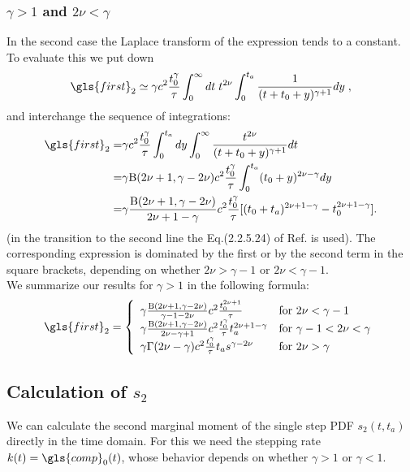 \subsubsection{$\gamma>1$ and $2\nu < \gamma$}
In the second case the Laplace transform of the expression tends to a constant. To evaluate this we put down 
\begin{equation}
 \gls{first}_2 \simeq  \gamma c^2 \frac{t_0^\gamma}{\tau} \int_0^\infty dt \; t^{2\nu} \int_0^{t_a} \frac{1}{(t+t_0+y)^{\gamma+1}} dy \; ,
\end{equation}
and interchange the sequence of integrations:
\begin{align}
 \gls{first}_2 =& \gamma c^2 \frac{ t_0^\gamma}{\tau} \int_0^{t_a} dy \int_0^\infty \frac{t^{2\nu}}{(t+t_0+y)^{\gamma+1}} dt \nonumber \\
 =& \gamma \mathrm{B}(2\nu+1,\gamma - 2\nu) c^2 \frac{ t_0^\gamma}{\tau}  \int_0^{t_a} (t_0+y)^{2\nu -\gamma} dy \nonumber \\
 =& \gamma  \frac{\mathrm{B}(2\nu+1,\gamma - 2\nu) }{2 \nu +1- \gamma } c^2 \frac{t_0^\gamma}{\tau} [(t_0+t_a)^{2\nu +1- \gamma }-t_0^{2\nu+1 - \gamma }]. \nonumber
\end{align}
%
(in the transition to the second line the Eq.(2.2.5.24) of Ref. \cite{BryPr} is used). The corresponding expression is dominated by the first or by the second term in the square 
brackets, depending on whether $2\nu > \gamma -1$ or $2\nu < \gamma -1$. \\
We summarize our results for $\gamma > 1$ in the following formula:
\begin{equation}
 \gls{first}_2 = \left\{
 \begin{array}{ll}
   \gamma \frac{\mathrm{B}(2\nu+1,\gamma - 2\nu)}{ \gamma -1 - 2 \nu} c^2 \frac{  t_0^{2\nu +1}}{\tau}  & \mbox{for } 2\nu < \gamma -1 \\
  \gamma \frac{\mathrm{B}(2\nu+1,\gamma - 2\nu)}{2 \nu - \gamma +1} c^2 \frac{ t_0^\gamma}{\tau} t_a^{2\nu +1- \gamma }  & \mbox{for } \gamma-1 < 2\nu < \gamma \\ 
 \gamma \Gamma(2\nu-\gamma) c^2 \frac{t_0^\gamma}{\tau} t_a s^{\gamma - 2\nu} & \mbox{for } 2\nu > \gamma 
 \end{array}
 \right.
\end{equation}


\subsection*{Calculation of $s_2$}
We can calculate the second marginal moment of the single step PDF $s_{2}(t,t_a)$ directly in the time domain. For this we need the stepping rate $k(t)=\gls{comp}_0(t)$, whose behavior depends on whether $\gamma>1$ or $\gamma<1$.

